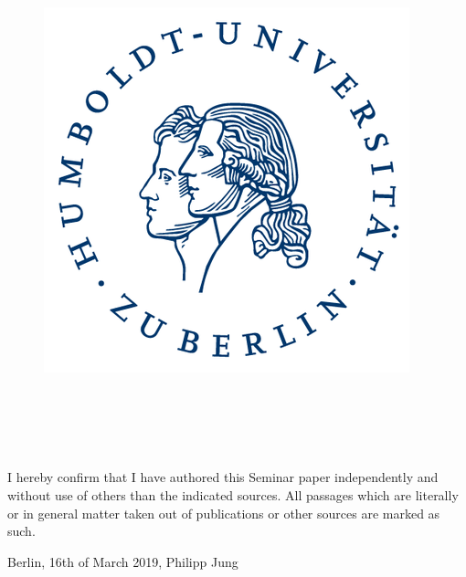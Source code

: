 \begin{titlepage}


\begin{figure}[h]
    \begin{flushright}
    \includegraphics[width=.3\textwidth]{Bilder/hu-logo.png}  
    \end{flushright}
  \label{fig:spektren01sd}
\end{figure}

\vspace{10mm}


\begin{center}
		\vspace{10mm}
	
	{\Huge
					\versuch \\
			}
		\vspace{10mm}
		{\untertitel}\\
		\vspace{10mm}
		\datumversuch \\
		\vspace{15mm}
		
\end{center}

\begin{table}[h]
\begin{tabular}{l l}

\end{tabular}
\end{table}  
\begin{center}
I hereby confirm that I have authored this Seminar paper independently and without use of others than the indicated sources. All passages which are literally or in general matter taken out of publications or other sources are marked as such.
\vspace{5mm}

Berlin, 16th of March 2019, Philipp Jung
\end{center}
\vspace{0mm}

\end{titlepage}